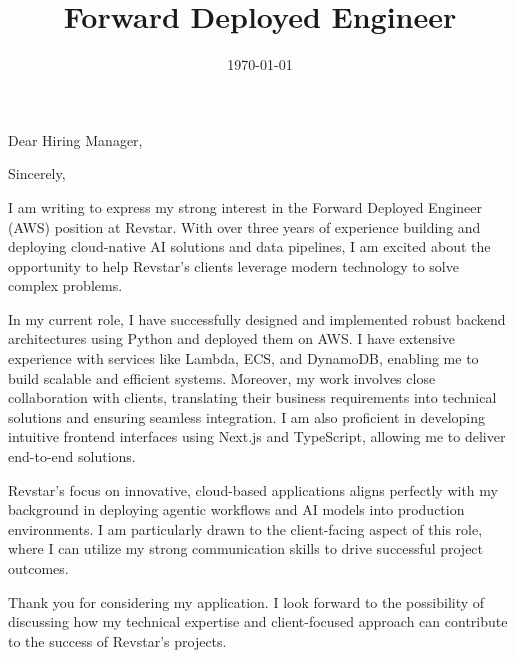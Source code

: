 \documentclass[11pt,a4paper,sans]{moderncv}
\title{Forward Deployed Engineer}
\begin{document}
\date{\today}
\opening{Dear Hiring Manager,}
\closing{Sincerely,}

\makelettertitle

I am writing to express my strong interest in the Forward Deployed Engineer (AWS) position at Revstar. With over three years of experience building and deploying cloud-native AI solutions and data pipelines, I am excited about the opportunity to help Revstar's clients leverage modern technology to solve complex problems.

In my current role, I have successfully designed and implemented robust backend architectures using Python and deployed them on AWS. I have extensive experience with services like Lambda, ECS, and DynamoDB, enabling me to build scalable and efficient systems. Moreover, my work involves close collaboration with clients, translating their business requirements into technical solutions and ensuring seamless integration. I am also proficient in developing intuitive frontend interfaces using Next.js and TypeScript, allowing me to deliver end-to-end solutions. 

Revstar's focus on innovative, cloud-based applications aligns perfectly with my background in deploying agentic workflows and AI models into production environments. I am particularly drawn to the client-facing aspect of this role, where I can utilize my strong communication skills to drive successful project outcomes.

Thank you for considering my application. I look forward to the possibility of discussing how my technical expertise and client-focused approach can contribute to the success of Revstar's projects.

\makeletterclosing
\end{document}
